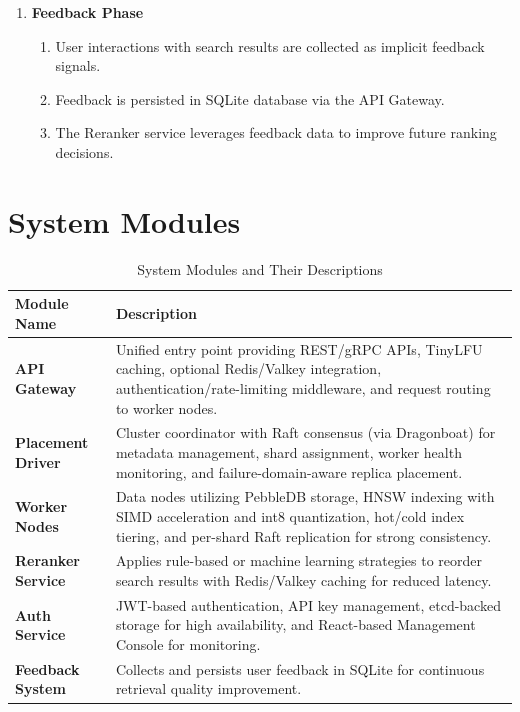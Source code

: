\begin{enumerate}
    \item \textbf{Feedback Phase}
    \begin{enumerate}
        \item User interactions with search results are collected as implicit feedback signals.
        \item Feedback is persisted in SQLite database via the API Gateway.
        \item The Reranker service leverages feedback data to improve future ranking decisions.
    \end{enumerate}
\end{enumerate}

\section{System Modules}

\begin{table}[h!]
\centering
\begin{tabular}{|l|p{10cm}|}
\hline
\textbf{Module Name} & \textbf{Description} \\
\hline
\textbf{API Gateway} & Unified entry point providing REST/gRPC APIs, TinyLFU caching, optional Redis/Valkey integration, authentication/rate-limiting middleware, and request routing to worker nodes. \\
\hline
\textbf{Placement Driver} & Cluster coordinator with Raft consensus (via Dragonboat) for metadata management, shard assignment, worker health monitoring, and failure-domain-aware replica placement. \\
\hline
\textbf{Worker Nodes} & Data nodes utilizing PebbleDB storage, HNSW indexing with SIMD acceleration and int8 quantization, hot/cold index tiering, and per-shard Raft replication for strong consistency. \\
\hline
\textbf{Reranker Service} & Applies rule-based or machine learning strategies to reorder search results with Redis/Valkey caching for reduced latency. \\
\hline
\textbf{Auth Service} & JWT-based authentication, API key management, etcd-backed storage for high availability, and React-based Management Console for monitoring. \\
\hline
\textbf{Feedback System} & Collects and persists user feedback in SQLite for continuous retrieval quality improvement. \\
\hline
\end{tabular}
\caption{System Modules and Their Descriptions}
\end{table}

